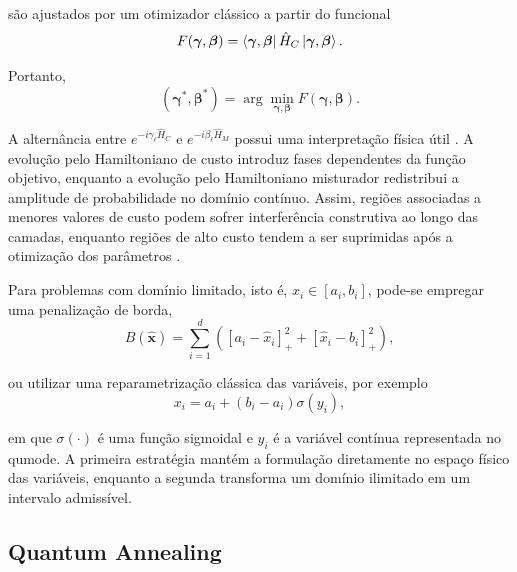 \noindent são ajustados por um otimizador clássico a partir do funcional
\begin{equation}
    F(\boldsymbol{\gamma},\boldsymbol{\beta})
    =
    \bra{\boldsymbol{\gamma},\boldsymbol{\beta}}
    \hat{H}_C
    \ket{\boldsymbol{\gamma},\boldsymbol{\beta}}.
    \label{eq:cv_qaoa_objective}
\end{equation}

Portanto,
\begin{equation}
    (\boldsymbol{\gamma}^{*},\boldsymbol{\beta}^{*})
    =
    \arg\min_{\boldsymbol{\gamma},\boldsymbol{\beta}}
    F(\boldsymbol{\gamma},\boldsymbol{\beta}).
    \label{eq:cv_qaoa_parameter_optimization}
\end{equation}

A alternância entre $e^{-i\gamma_{\ell}\hat{H}_C}$ e $e^{-i\beta_{\ell}\hat{H}_M}$ possui uma interpretação física útil \cite{verdon2019quantum}. A evolução pelo Hamiltoniano de custo introduz fases dependentes da função objetivo, enquanto a evolução pelo Hamiltoniano misturador redistribui a amplitude de probabilidade no domínio contínuo. Assim, regiões associadas a menores valores de custo podem sofrer interferência construtiva ao longo das camadas, enquanto regiões de alto custo tendem a ser suprimidas após a otimização dos parâmetros \cite{arrazola2019machine}.

Para problemas com domínio limitado, isto é, $x_i \in [a_i,b_i]$, pode-se empregar uma penalização de borda,
\begin{equation}
    B(\hat{\mathbf{x}})
    =
    \sum_{i=1}^{d}
    \left(
    [a_i-\hat{x}_i]_+^2
    +
    [\hat{x}_i-b_i]_+^2
    \right),
    \label{eq:boundary_penalty}
\end{equation}

\noindent ou utilizar uma reparametrização clássica das variáveis, por exemplo
\begin{equation}
    x_i
    =
    a_i + (b_i-a_i)\sigma(y_i),
    \label{eq:bounded_reparametrization}
\end{equation}

\noindent em que $\sigma(\cdot)$ é uma função sigmoidal e $y_i$ é a variável contínua representada no qumode. A primeira estratégia mantém a formulação diretamente no espaço físico das variáveis, enquanto a segunda transforma um domínio ilimitado em um intervalo admissível.

\subsection{Quantum Annealing}\label{sec:qa}

